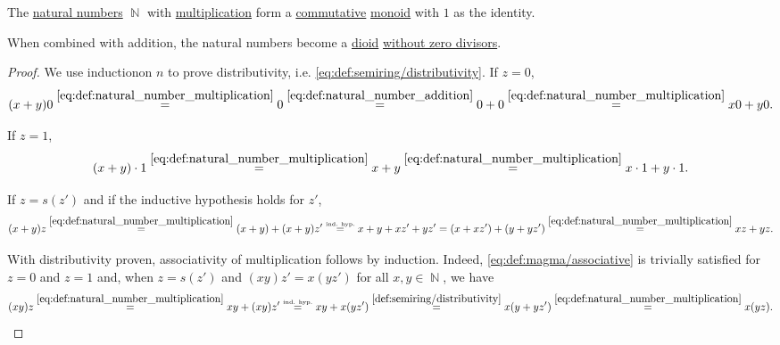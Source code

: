 \begin{proposition}\label{thm:natural_numbers_form_dioid}
  The \hyperref[def:natural_numbers]{natural numbers} \( \BbbN \) with \hyperref[def:natural_number_multiplication]{multiplication} form a \hyperref[def:magma/commutative]{commutative} \hyperref[def:unital_magma/associative]{monoid} with \( 1 \) as the identity.

  When combined with addition, the natural numbers become a \hyperref[def:semiring]{dioid} \hyperref[def:semiring/no_zero_divisor]{without zero divisors}.
\end{proposition}
\begin{proof}
   We use induction\IND on \( n \) to prove distributivity, i.e. \eqref{eq:def:semiring/distributivity}. If \( z = 0 \),
  \begin{equation*}
    (x + y)0
    \overset{\eqref{eq:def:natural_number_multiplication}} =
    0
    \overset{\eqref{eq:def:natural_number_addition}} =
    0 + 0
    \overset{\eqref{eq:def:natural_number_multiplication}} =
    x0 + y0.
  \end{equation*}

  If \( z = 1 \),
  \begin{equation*}
    (x + y) \cdot 1
    \overset{\eqref{eq:def:natural_number_multiplication}} =
    x + y
    \overset{\eqref{eq:def:natural_number_multiplication}} =
    x \cdot 1 + y \cdot 1.
  \end{equation*}

  If \( z = s(z') \) and if the inductive hypothesis holds for \( z' \),
  \begin{equation*}
    (x + y)z
    \overset{\eqref{eq:def:natural_number_multiplication}} =
    (x + y) + (x + y) z'
    \overset {\scriptscriptstyle{\text{ind. hyp.}}} =
    x + y + xz' + yz'
    =
    (x + xz') + (y + yz')
    \overset{\eqref{eq:def:natural_number_multiplication}} =
    xz + yz.
  \end{equation*}

   With distributivity proven, associativity of multiplication follows by induction\IND. Indeed, \eqref{eq:def:magma/associative} is trivially satisfied for \( z = 0 \) and \( z = 1 \) and, when \( z = s(z') \) and \( (xy)z' = x(yz') \) for all \( x, y \in \BbbN \), we have
  \begin{equation*}
    (xy)z
    \overset{\eqref{eq:def:natural_number_multiplication}} =
    xy + (xy) z'
    \overset {\scriptscriptstyle{\text{ind. hyp.}}} =
    xy + x(y z')
    \overset{\ref{def:semiring/distributivity}} =
    x(y + y z')
    \overset{\eqref{eq:def:natural_number_multiplication}} =
    x(yz).
  \end{equation*}


\end{proof}
